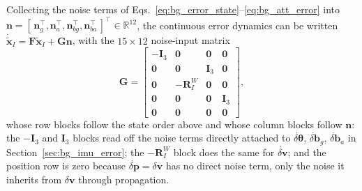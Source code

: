 Collecting the noise terms of Eqs.~\ref{eq:bg_error_state}--\ref{eq:bg_att_error} into $\mathbf{n} = [\,\mathbf{n}_g^\top, \mathbf{n}_a^\top, \mathbf{n}_{bg}^\top, \mathbf{n}_{ba}^\top\,]^\top \in \mathbb{R}^{12}$, the continuous error dynamics can be written $\dot{\tilde{\mathbf{x}}}_I = \mathbf{F}\tilde{\mathbf{x}}_I + \mathbf{G}\mathbf{n}$, with the $15\times12$ noise-input matrix
\begin{equation}
  \mathbf{G} =
  \begin{bmatrix}
    -\mathbf{I}_3 & \mathbf{0} & \mathbf{0} & \mathbf{0} \\
    \mathbf{0} & \mathbf{0} & \mathbf{I}_3 & \mathbf{0} \\
    \mathbf{0} & -\mathbf{R}_I^W & \mathbf{0} & \mathbf{0} \\
    \mathbf{0} & \mathbf{0} & \mathbf{0} & \mathbf{I}_3 \\
    \mathbf{0} & \mathbf{0} & \mathbf{0} & \mathbf{0}
  \end{bmatrix},
  \label{eq:a_G}
\end{equation}
whose row blocks follow the state order above and whose column blocks follow $\mathbf{n}$: the $-\mathbf{I}_3$ and $\mathbf{I}_3$ blocks read off the noise terms directly attached to $\dot{\delta\boldsymbol{\theta}}$, $\dot{\delta\mathbf{b}}_g$, $\dot{\delta\mathbf{b}}_a$ in Section~\ref{sec:bg_imu_error}; the $-\mathbf{R}_I^W$ block does the same for $\dot{\delta\mathbf{v}}$; and the position row is zero because $\dot{\delta\mathbf{p}} = \delta\mathbf{v}$ has no direct noise term, only the noise it inherits from $\delta\mathbf{v}$ through propagation.

